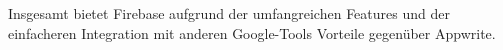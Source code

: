 
Insgesamt bietet Firebase aufgrund der umfangreichen Features und der einfacheren Integration mit anderen Google-Tools Vorteile gegenüber Appwrite.


